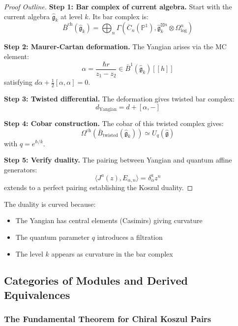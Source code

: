 \begin{proof}[Proof Outline]
\textbf{Step 1: Bar complex of current algebra.}
Start with the current algebra $\hat{\mathfrak{g}}_k$ at level $k$. Its bar complex is:
$$\bar{B}^{\text{ch}}(\hat{\mathfrak{g}}_k) = \bigoplus_n \Gamma(\overline{C}_n(\mathbb{P}^1), \hat{\mathfrak{g}}_k^{\boxtimes n} \otimes \Omega^n_{\log})$$

\textbf{Step 2: Maurer-Cartan deformation.}
The Yangian arises via the MC element:
$$\alpha = \frac{\hbar r}{z_1 - z_2} \in \bar{B}^1(\hat{\mathfrak{g}}_k)[[h]]$$
satisfying $d\alpha + \frac{1}{2}[\alpha,\alpha] = 0$.

\textbf{Step 3: Twisted differential.}
The deformation gives twisted bar complex:
$$d_{\text{Yangian}} = d + [\alpha, -]$$

\textbf{Step 4: Cobar construction.}
The cobar of this twisted complex gives:
$$\Omega^{\text{ch}}(\bar{B}_{\text{twisted}}(\hat{\mathfrak{g}}_k)) \simeq U_q(\hat{\mathfrak{g}})$$
with $q = e^{\hbar/k}$.

\textbf{Step 5: Verify duality.}
The pairing between Yangian and quantum affine generators:
$$\langle J^a(z), E_{\alpha,n} \rangle = \delta^a_\alpha z^n$$
extends to a perfect pairing establishing the Koszul duality.
\end{proof}

\begin{remark}
The duality is curved because:
\begin{itemize}
\item The Yangian has central elements (Casimirs) giving curvature
\item The quantum parameter $q$ introduces a filtration
\item The level $k$ appears as curvature in the bar complex
\end{itemize}
\end{remark}


\subsection{Categories of Modules and Derived Equivalences}

\subsubsection{The Fundamental Theorem for Chiral Koszul Pairs}

